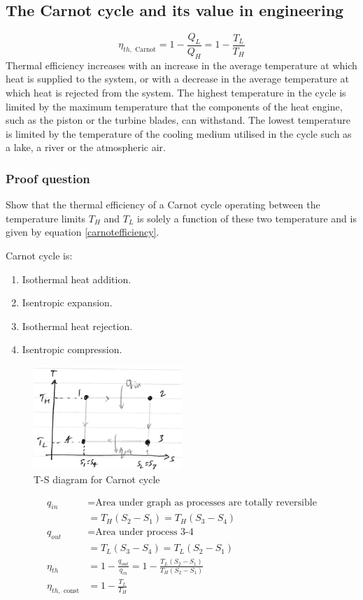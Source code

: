 \documentclass[class=report, crop=false, 12pt,a4paper]{standalone}
\begin{document}
\subsection{The Carnot cycle and its value in engineering}
\begin{equation}
  \eta_{th, \textrm{ Carnot}} = 1 - \frac{Q_L}{Q_H} = 1 - \frac{T_L}{T_H}
  \label{carnotefficiency}
\end{equation}
Thermal efficiency increases with an increase in the average temperature at which heat is supplied to the system, or with a decrease in the average temperature at which heat is rejected from the system. The highest temperature in the cycle is limited by the maximum temperature that the components of the heat engine, such as the piston or the turbine blades, can withstand. The lowest temperature is limited by the temperature of the cooling medium utilised in the cycle such as a lake, a river or the atmospheric air.
\subsubsection{Proof question}
Show that the thermal efficiency of a Carnot cycle operating between the temperature limits $T_H$ and $T_L$ is solely a function of these two temperature and is given by equation \ref{carnotefficiency}.

Carnot cycle is:
\begin{enumerate}[noitemsep]
  \item Isothermal heat addition.
  \item Isentropic expansion.
  \item Isothermal heat rejection.
  \item Isentropic compression.
\end{enumerate}
\begin{figure}
  \centering
  \includegraphics[width = 0.5\textwidth]{../img/carnotq}
  \caption{T-S diagram for Carnot cycle}
\end{figure}
\begin{align}
  q_{in} &= \textrm{Area under graph as processes are totally reversible}\\
  &= T_H(S_2 - S_1) = T_H(S_3 - S_4)\\
  q_{out} &= \textrm{Area under process 3-4}\\
  &= T_L(S_3 - S_4) = T_L(S_2 - S_1)\\
  \eta_{th} &= 1 - \frac{q_{out}}{q_{in}} = 1 - \frac{T_L(S_2 - S_1)}{T_H(S_2 - S_1)}\\
  \eta_{th, \textrm{ const}} &= 1 - \frac{T_L}{T_H}
\end{align}
\end{document}
